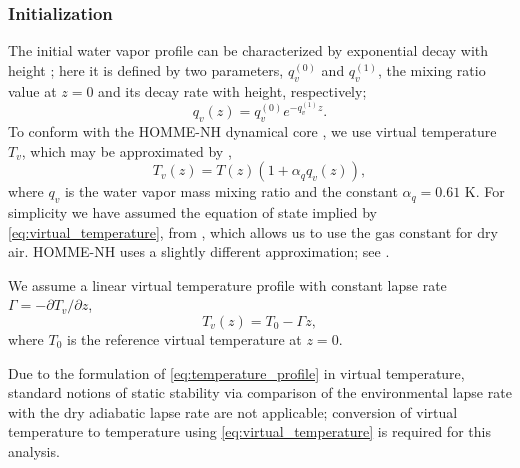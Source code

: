 \subsubsection{Initialization}

The initial water vapor profile can be characterized by exponential decay with height \cite{Hashimoto2005,Palchetti2008}; here it is defined by two parameters, $q_v^{(0)}$ and $q_v^{(1)}$, the mixing ratio value at $z=0$ and its decay rate with height, respectively;
\begin{equation}\label{eq:qv_profile}
  q_v(z) = q_v^{(0)}e^{-q_v^{(1)}z}.
\end{equation}
To conform with the HOMME-NH dynamical core \cite{Taylor2020}, we use  virtual temperature $T_v$, which may be approximated by \cite[eqn.~(2.1)]{KlempWilhelmson1978},
\begin{equation}\label{eq:virtual_temperature}
  T_v(z) = T(z)(1+\alpha_q q_v(z)),
\end{equation}
where $q_v$ is the water vapor mass mixing ratio and the constant $\alpha_q = 0.61$ K.
For simplicity we have assumed the equation of state implied by \eqref{eq:virtual_temperature}, from \cite{KlempWilhelmson1978}, which allows us to use the gas constant for dry air.  
   HOMME-NH uses a slightly different approximation; see \cite[sec.~2.3]{Taylor2020}.
   
We assume a linear virtual temperature profile with constant lapse rate $\Gamma = -\partial T_v/\partial z$,
\begin{equation}\label{eq:temperature_profile}
  T_v(z) = T_0 - \Gamma z,
\end{equation}
where $T_0$ is the reference virtual temperature at $z=0$.  

\begin{rem}
  Due to the formulation of \eqref{eq:temperature_profile} in virtual temperature, standard notions of static stability via comparison of the environmental lapse rate with the dry adiabatic lapse rate are not applicable; conversion of virtual temperature to temperature using \eqref{eq:virtual_temperature} is required for this analysis.
\end{rem}

